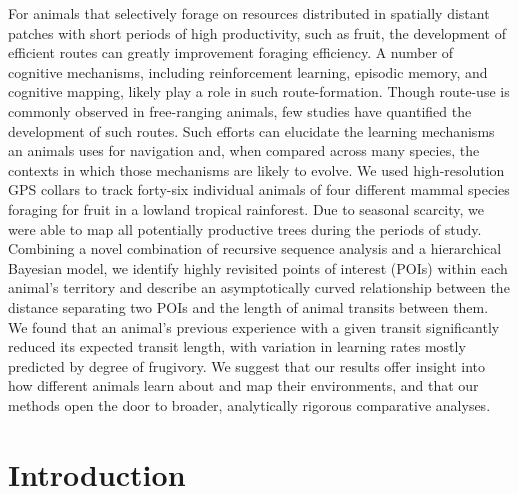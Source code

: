 \documentclass[twoside,12pt,final]{ucthesis-CA2012}
\begin{document}
\begin{ucmainmatter}
For animals that selectively forage on resources distributed in spatially distant patches with short periods of high productivity, such as fruit, the development of efficient routes can greatly improvement foraging efficiency. A number of cognitive mechanisms, including reinforcement learning, episodic memory, and cognitive mapping, likely play a role in such route-formation. Though route-use is commonly observed in free-ranging animals, few studies have quantified the development of such routes. Such efforts can elucidate the learning mechanisms an animals uses for navigation and, when compared across many species, the contexts in which those mechanisms are likely to evolve. We used high-resolution GPS collars to track forty-six individual animals of four different mammal species foraging for fruit in a lowland tropical rainforest. Due to seasonal scarcity, we were able to map all potentially productive trees during the periods of study. Combining a novel combination of recursive sequence analysis and a hierarchical Bayesian model, we identify highly revisited points of interest (POIs) within each animal's territory and describe an asymptotically curved relationship between the distance separating two POIs and the length of animal transits between them. We found that an animal's previous experience with a given transit significantly reduced its expected transit length, with variation in learning rates mostly predicted by degree of frugivory. We suggest that our results offer insight into how different animals learn about and map their environments, and that our methods open the door to broader, analytically rigorous comparative analyses.

\hypertarget{introduction-4}{%
\section{Introduction}\label{introduction-4}}


\end{ucmainmatter}
\end{document}
